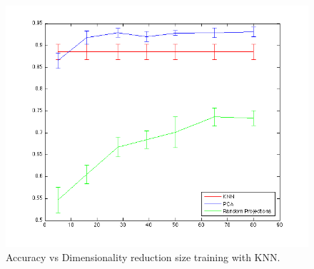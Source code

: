\begin{center}
\begin{figure}[!ht]
\centering
\includegraphics[width=.7\textwidth]{../images/knnVpcaVrproj.png}
\caption{Accuracy vs Dimensionality reduction size training with KNN.}
\label{fig:knn}
\end{figure}
\end{center}

